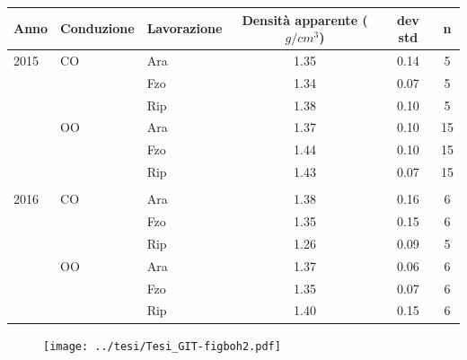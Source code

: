 \documentclass[10pt]{beamer}
\begin{document}
\begin{frame}[label=Core]

  \vspace{1.5cm}
  \hyperlink{densita}{}
  \footnotesize
  \begin{table}[ht]
    \centering
    \begin{tabular}{lllccc}
      \hline
      Anno & Conduzione & Lavorazione & Densit\`a apparente
                                        ($g/cm^3$) & dev std & n \\ 
      \hline
      2015 & CO & Ara & 1.35 & 0.14 &   5 \\ 
           &    & Fzo & 1.34 & 0.07 &   5 \\ 
           &    & Rip & 1.38 & 0.10 &   5 \\ 
           & OO & Ara & 1.37 & 0.10 &  15 \\ 
           &    & Fzo & 1.44 & 0.10 &  15 \\ 
           &    & Rip & 1.43 & 0.07 &  15 \\ 
      \\
      2016 & CO & Ara & 1.38 & 0.16 &   6 \\ 
           &    & Fzo & 1.35 & 0.15 &   6 \\ 
           &    & Rip & 1.26 & 0.09 &   5 \\ 
           & OO & Ara & 1.37 & 0.06 &   6 \\ 
           &    & Fzo & 1.35 & 0.07 &   6 \\ 
           &    & Rip & 1.40 & 0.15 &   6 \\ 
      \hline
    \end{tabular}
    \label{tab:RiassuntoDensitaCAmpo}
  \end{table}
\end{frame}


\begin{frame}
  \vspace{1.5cm}
  \begin{figure}
    \texttt{[image: ../tesi/Tesi\_GIT-figboh2.pdf]}
  \end{figure}
\end{frame}
\end{document}
